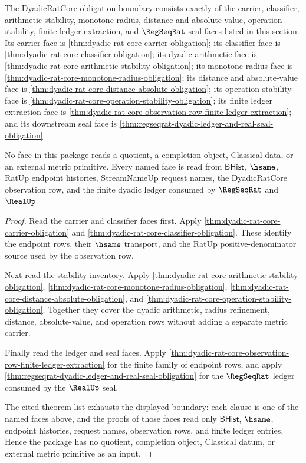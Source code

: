 \begin{theorem}
\label{thm:dyadic-rat-core-obligation-boundary-package}
The DyadicRatCore obligation boundary consists exactly of the carrier,
classifier, arithmetic-stability, monotone-radius, distance and absolute-value,
operation-stability, finite-ledger extraction, and $\RegSeqRat$ seal faces
listed in this section. Its carrier face is
\autoref{thm:dyadic-rat-core-carrier-obligation}; its classifier face is
\autoref{thm:dyadic-rat-core-classifier-obligation}; its dyadic arithmetic
face is \autoref{thm:dyadic-rat-core-arithmetic-stability-obligation}; its
monotone-radius face is
\autoref{thm:dyadic-rat-core-monotone-radius-obligation}; its distance and
absolute-value face is
\autoref{thm:dyadic-rat-core-distance-absolute-obligation}; its operation
stability face is
\autoref{thm:dyadic-rat-core-operation-stability-obligation}; its finite
ledger extraction face is
\autoref{thm:dyadic-rat-core-observation-row-finite-ledger-extraction}; and
its downstream seal face is
\autoref{thm:regseqrat-dyadic-ledger-and-real-seal-obligation}.

No face in this package reads a quotient, a completion object, Classical data,
or an external metric primitive. Every named face is read from $\mathsf{BHist}$,
$\hsame$, RatUp endpoint histories, StreamNameUp request names, the
DyadicRatCore observation row, and the finite dyadic ledger consumed by
$\RegSeqRat$ and $\RealUp$.
\end{theorem}
\begin{proof}
Read the carrier and classifier faces first. Apply
\autoref{thm:dyadic-rat-core-carrier-obligation} and
\autoref{thm:dyadic-rat-core-classifier-obligation}. These identify the
endpoint rows, their $\hsame$ transport, and the RatUp positive-denominator
source used by the observation row.

Next read the stability inventory. Apply
\autoref{thm:dyadic-rat-core-arithmetic-stability-obligation},
\autoref{thm:dyadic-rat-core-monotone-radius-obligation},
\autoref{thm:dyadic-rat-core-distance-absolute-obligation}, and
\autoref{thm:dyadic-rat-core-operation-stability-obligation}. Together they
cover the dyadic arithmetic, radius refinement, distance, absolute-value, and
operation rows without adding a separate metric carrier.

Finally read the ledger and seal faces. Apply
\autoref{thm:dyadic-rat-core-observation-row-finite-ledger-extraction} for the
finite family of endpoint rows, and apply
\autoref{thm:regseqrat-dyadic-ledger-and-real-seal-obligation} for the
$\RegSeqRat$ ledger consumed by the $\RealUp$ seal.

The cited theorem list exhausts the displayed boundary: each clause is one of
the named faces above, and the proofs of those faces read only $\mathsf{BHist}$,
$\hsame$, endpoint histories, request names, observation rows, and finite
ledger entries. Hence the package has no quotient, completion object,
Classical datum, or external metric primitive as an input.
\end{proof}

